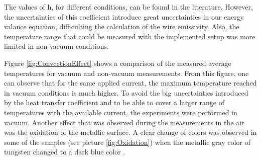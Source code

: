 The values of h, for different conditions, can be found in the literature. However, the uncertainties of this coefficient introduce great uncertainties in our energy valance equation, difficulting the calculation of the wire emissivity. Also, the temperature range that could be measured with the implemented setup was more limited in non-vacuum conditions. 

Figure \ref{fig:ConvectionEffect} shows a comparison of the measured average temperatures for vacuum and non-vacuum measurements. From this figure, one can observe that for the same applied current, the maximum temperature reached in vacuum conditions is much higher. To avoid the big uncertainties introduced by the heat transfer coefficient and to be able to cover a larger range of temperatures with the available current, the experiments were performed in vacuum. Another effect that was observed during the measurements in the air was the oxidation of the metallic surface. A clear change of colors was observed in some of the samples (see picture \ref{fig:Oxidation}) when the metallic gray color of tungsten changed to a dark blue color \parencite[][]{ref:CiteOxidation}.






